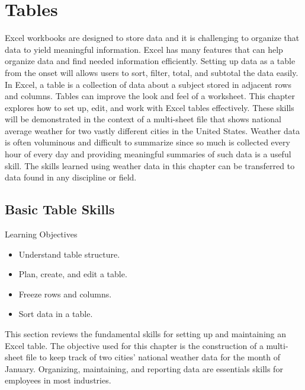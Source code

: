 \chapter{Tables}\label{ch05:tables}

Excel workbooks are designed to store data and it is challenging to organize that data to yield meaningful information. Excel has many features that can help organize data and find needed information efficiently. Setting up data as a table from the onset will allows users to sort, filter, total, and subtotal the data easily. In Excel, a table is a collection of data about a subject stored in adjacent rows and columns. Tables can improve the look and feel of a worksheet. This chapter explores how to set up, edit, and work with Excel tables effectively. These skills will be demonstrated in the context of a multi-sheet file that shows national average weather for two vastly different cities in the United States. Weather data is often voluminous and difficult to summarize since so much is collected every hour of every day and providing meaningful summaries of such data is a useful skill. The skills learned using weather data in this chapter can be transferred to data found in any discipline or field.

\section{Basic Table Skills}

\begin{center}
	\begin{objbox}{Learning Objectives}
		\begin{itemize}
			\setlength{\itemsep}{0pt}
			\setlength{\parskip}{0pt}
			\setlength{\parsep}{0pt}
			
			\item Understand table structure.
			\item Plan, create, and edit a table.
			\item Freeze rows and columns.
			\item Sort data in a table.
		\end{itemize}
	\end{objbox}
\end{center}

This section reviews the fundamental skills for setting up and maintaining an Excel table. The objective used for this chapter is the construction of a multi-sheet file to keep track of two cities' national weather data for the month of January. Organizing, maintaining, and reporting data are essentials skills for employees in most industries.

